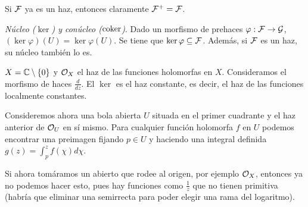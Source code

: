 \documentclass[GA.tex]{subfiles}
\begin{document}
Si $\mathcal{F}$ ya es un haz, entonces claramente $\mathcal{F}^+=\mathcal{F}$.

\begin{defi}
\emph{Núcleo ($\ker$) y conúcleo ($\operatorname{coker}$)}. Dado un morfismo de prehaces $\varphi:\mathcal{F}\to \mathcal{G}$,  $(\ker\varphi)(U)=\ker\varphi(U)$. Se tiene que $\ker\varphi\subseteq \mathcal{F}$. Además, si $\mathcal{F}$ es un haz, su núcleo también lo es.  
\end{defi}

\begin{ej}
$X=\mathbb{C}\setminus\{0\}$ y ${\mathcal O}_X$ el haz de las funciones holomorfas en $X$. Consideramos el morfismo de haces $\frac{d}{dz}$. El $\ker$ es el haz constante, es decir, el haz de las funciones localmente constantes. 

Consideremos ahora una bola abierta $U$ situada en el primer cuadrante y el haz anterior de ${\mathcal O}_U$ en sí mismo. Para cualquier función holomorfa $f$ en $U$ podemos encontrar una preimagen fijando $p\in U$ y haciendo una integral definida $g(z)=\int_p^zf(\chi)d\chi$. 

Si ahora tomáramos un abierto que rodee al origen, por ejemplo ${\mathcal O}_X$, entonces ya no podemos hacer esto, pues hay funciones como $\frac{1}{z}$ que no tienen primitiva (habría que eliminar una semirrecta para poder elegir una rama del logaritmo).  
\end{ej}
\end{document}
